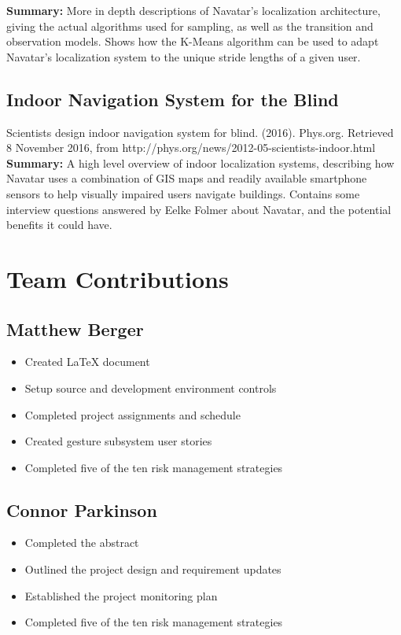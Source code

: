 \documentclass{scrreprt}
\begin{document}
\textbf{Summary:}
More in depth descriptions of Navatar’s localization architecture, giving the actual algorithms used for sampling, as well as the transition and observation models. Shows how the K-Means algorithm can be used to adapt Navatar’s localization system to the unique stride lengths of a given user.

\section{Indoor Navigation System for the Blind}
Scientists design indoor navigation system for blind. (2016). Phys.org. Retrieved 8 November 2016, from http://phys.org/news/2012-05-scientists-indoor.html\\

\textbf{Summary:}
A high level overview of indoor localization systems, describing how Navatar uses a combination of GIS maps and readily available smartphone sensors to help visually impaired users navigate buildings. Contains some interview questions answered by Eelke Folmer about Navatar, and the potential benefits it could have.

\chapter{Team Contributions}
	\section{Matthew Berger}
		\begin{itemize}
			\item Created LaTeX document
			\item Setup source and development environment controls
			\item Completed project assignments and schedule
			\item Created gesture subsystem user stories
			\item Completed five of the ten risk management strategies
		\end{itemize}
	\section{Connor Parkinson}
		\begin{itemize}
			\item Completed the abstract
			\item Outlined the project design and requirement updates
			\item Established the project monitoring plan
			\item Completed five of the ten risk management strategies
		\end{itemize}
\end{document}

